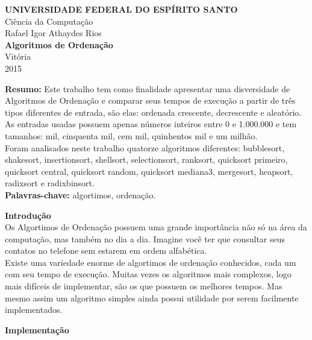\documentclass{article}
\begin{document}
\begin{titlepage}
\begin{center}
{\large \bf UNIVERSIDADE FEDERAL DO ESP\'IRITO SANTO} \\ 
{\large  Ci\^encia da Computação}\\[5.5cm]
{\large  Rafael Igor Athaydes Rios } \\ [5.5cm]
{\Huge \bf Algoritmos de Ordenação} \\ [12cm]
{Vitória} \\
2015
\end{center}
\end{titlepage}
\newpage
\begin{flushleft}
{\Large \bf{Resumo:}}
\large Este trabalho tem como finalidade apresentar uma disversidade de Algoritmos de Ordena\c{c}\~ao e comparar seus tempos de execução a partir de três tipos diferentes de entrada, são elas: ordenada crescente, decrescente e aleat\'orio.\\
As entradas usadas possuem apenas números inteiros entre 0 e 1.000.000 e tem tamanhos: mil, cinquenta mil, cem mil, quinhentos mil e um milhão.\\
Foram analisados neste trabalho quatorze algoritmos diferentes: bubblesort, shakesort, insertionsort, shellsort, selectionsort, ranksort, quicksort primeiro, quicksort central,
quicksort random, quicksort mediana3, mergesort, heapsort, radixsort e radixbinsort.\\ [1cm]

{\Large \bf Palavras-chave:}
algortimos, ordenação.

\newpage

{\huge \bf Introdução}\\ [1cm]

\hspace{10 mm} Os Algortimos de Ordenação possuem uma grande importância não só na área da computação, mas também no dia a dia. Imagine você ter que consultar seus contatos no telefone sem estarem em ordem alfabética. \\
\hspace{10 mm} Existe uma variedade enorme de algortimos de ordenação conhecidos, cada um com seu tempo de execução. Muitas vezes os algoritmos mais complexos, logo mais difíceis de implementar, são os que possuem os melhores tempos. Mas mesmo assim um algoritmo simples ainda possui utilidade por serem facilmente implementados.

\newpage

{\huge \bf Implementação} \\ [1cm]


\end{flushleft}
\end{document}
